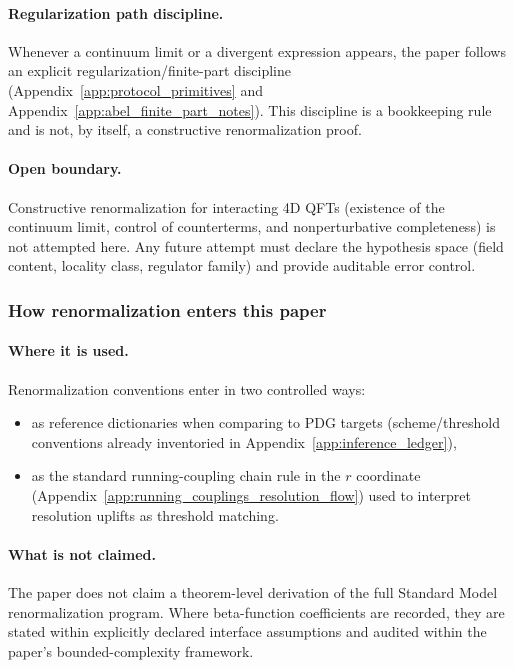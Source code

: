 \paragraph{Regularization path discipline.}
\AuditTag Whenever a continuum limit or a divergent expression appears, the paper follows an explicit regularization/finite-part discipline (Appendix~\ref{app:protocol_primitives} and Appendix~\ref{app:abel_finite_part_notes}).
This discipline is a bookkeeping rule and is not, by itself, a constructive renormalization proof.

\paragraph{Open boundary.}
\AuditTag Constructive renormalization for interacting 4D QFTs (existence of the continuum limit, control of counterterms, and nonperturbative completeness) is not attempted here.
Any future attempt must declare the hypothesis space (field content, locality class, regulator family) and provide auditable error control.

\subsubsection{How renormalization enters this paper}
\paragraph{Where it is used.}
\MatchTag Renormalization conventions enter in two controlled ways:
\begin{itemize}
\item as reference dictionaries when comparing to PDG targets (scheme/threshold conventions already inventoried in Appendix~\ref{app:inference_ledger}),
\item as the standard running-coupling chain rule in the $r$ coordinate (Appendix~\ref{app:running_couplings_resolution_flow}) used to interpret resolution uplifts as threshold matching.
\end{itemize}

\paragraph{What is not claimed.}
\AuditTag The paper does not claim a theorem-level derivation of the full Standard Model renormalization program.
Where beta-function coefficients are recorded, they are stated within explicitly declared interface assumptions and audited within the paper's bounded-complexity framework.

